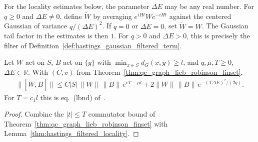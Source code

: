 For the locality estimates below, the parameter $\Delta E$ may be any real
number. For $q\ge0$ and $\Delta E\ne0$, define $\widetilde W$ by averaging
$e^{iHt}We^{-iHt}$ against the centered Gaussian of variance $q/(\Delta E)^2$.
If $q=0$ or $\Delta E=0$, set $\widetilde W=W$. The Gaussian tail factor in
the estimates is then $1$. For $q>0$ and $\Delta E>0$, this is precisely the
filter of Definition~\ref{def:hastings_gaussian_filtered_term}.

\begin{lemma}
    \label{thm:hastings05_filtered_locality_graph}
    \leanok
    Let $W$ act on $S$, $B$ act on $\{y\}$ with $\min_{x\in S}d_G(x,y)\ge l$,
    and $q,\mu,T\ge0$, $\Delta E\in\mathbb R$. With $(C,v)$ from
    Theorem~\ref{thm:qc_graph_lieb_robinson_finset},
    \begin{align}
        \|[\widetilde W,B]\|\le C|S|\,\|W\|\,\|B\|\,e^{vT-\mu l}
        +2\|W\|\,\|B\|\,e^{-(T\Delta E)^2/(2q)}.
        \label{eq:hastings05_filtered_graph_commutator}
    \end{align}
    For $T=c_1l$ this is eq.~(lbnd) of~\cite[lines 266--283]{Hastings2006Solving}.
\end{lemma}
\begin{proof}\leanok
    Combine the $|t|\le T$ commutator bound of
    Theorem~\ref{thm:qc_graph_lieb_robinson_finset} with
    Lemma~\ref{thm:hastings_filtered_locality}.
\end{proof}

